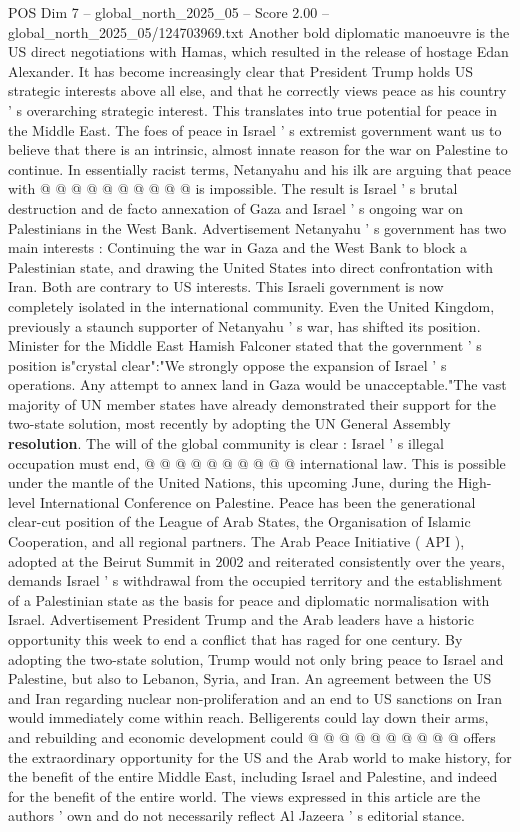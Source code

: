\begin{textsample}{POS Dim 7 – global\_north\_2025\_05 – Score 2.00 – global\_north\_2025\_05/124703969.txt}
Another bold diplomatic manoeuvre is the US direct negotiations with Hamas, which resulted in the release of hostage Edan Alexander.
It has become increasingly clear that President Trump holds US strategic interests above all else, and that he correctly views peace as his country ' s overarching strategic interest.
This translates into true potential for peace in the Middle East.
The foes of peace in Israel ' s extremist government want us to believe that there is an intrinsic, almost innate reason for the war on Palestine to continue.
In essentially racist terms, Netanyahu and his ilk are arguing that peace with @ @ @ @ @ @ @ @ @ @ is impossible.
The result is Israel ' s brutal destruction and de facto annexation of Gaza and Israel ' s ongoing war on Palestinians in the West Bank.
Advertisement Netanyahu ' s government has two main interests : Continuing the war in Gaza and the West Bank to block a Palestinian state, and drawing the United States into direct confrontation with Iran.
Both are contrary to US interests.
This Israeli government is now completely isolated in the international community.
Even the United Kingdom, previously a staunch supporter of Netanyahu ' s war, has shifted its position.
Minister for the Middle East Hamish Falconer stated that the government ' s position is"crystal clear":"We strongly oppose the expansion of Israel ' s operations.
Any attempt to annex land in Gaza would be unacceptable."The vast majority of UN member states have already demonstrated their support for the two-state solution, most recently by adopting the UN General Assembly \textbf{resolution}.
The will of the global community is clear : Israel ' s illegal occupation must end, @ @ @ @ @ @ @ @ @ @ international law.
This is possible under the mantle of the United Nations, this upcoming June, during the High-level International Conference on Palestine.
Peace has been the generational clear-cut position of the League of Arab States, the Organisation of Islamic Cooperation, and all regional partners.
The Arab Peace Initiative ( API ), adopted at the Beirut Summit in 2002 and reiterated consistently over the years, demands Israel ' s withdrawal from the occupied territory and the establishment of a Palestinian state as the basis for peace and diplomatic normalisation with Israel.
Advertisement President Trump and the Arab leaders have a historic opportunity this week to end a conflict that has raged for one century.
By adopting the two-state solution, Trump would not only bring peace to Israel and Palestine, but also to Lebanon, Syria, and Iran.
An agreement between the US and Iran regarding nuclear non-proliferation and an end to US sanctions on Iran would immediately come within reach.
Belligerents could lay down their arms, and rebuilding and economic development could @ @ @ @ @ @ @ @ @ @ offers the extraordinary opportunity for the US and the Arab world to make history, for the benefit of the entire Middle East, including Israel and Palestine, and indeed for the benefit of the entire world.
The views expressed in this article are the authors ' own and do not necessarily reflect Al Jazeera ' s editorial stance.

\end{textsample}
